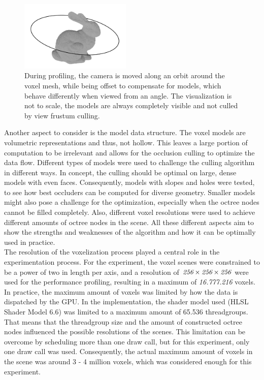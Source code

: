 \begin{figure}[h]
    \centering
    \includegraphics[width=200px]{images/graphics/test-anim-camera-path.jpg}
    \caption{During profiling, the camera is moved along an orbit around the voxel mesh, while being offset to compensate 
    for models, which behave differently when viewed from an angle. The visualization is not to scale, the models 
    are always completely visible and not culled by view frustum culling.}
    \label{fig:test-anim-camera-path}
\end{figure}

Another aspect to consider is the model data structure. The voxel models are volumetric representations and thus, 
not hollow. This leaves a large portion of computation to be irrelevant and allows for the occlusion culling to 
optimize the data flow. Different types of models were used to challenge the culling algorithm in different ways. 
In concept, the culling should be optimal on large, dense models with even faces. Consequently, models with 
slopes and holes were tested, to see how best occluders can be computed for diverse geometry. Smaller models might 
also pose a challenge for the optimization, especially when the octree nodes cannot be filled completely. Also, 
different voxel resolutions were used to achieve different amounts of octree nodes in the scene. All these different 
aspects aim to show the strengths and weaknesses of the algorithm and how it can be optimally used in practice. \\

\noindent
The resolution of the voxelization process played a central role in the experimentation process.
For the experiment, the voxel scenes were constrained to be a power of two in length per axis, and a resolution 
of $\emph{256} \times \emph{256} \times \emph{256}$ were used for the performance profiling, resulting in a maximum 
of \emph{16.777.216} voxels. In practice, the maximum amount of voxels was limited by how the data is dispatched 
by the \ac{GPU}. In the implementation, the shader model used (HLSL Shader Model 6.6) was limited to a maximum 
amount of 65.536 threadgroups. That means that the threadgroup size and the amount of constructed octree nodes 
influenced the possible resolutions of the scenes. This limitation can be overcome by scheduling more than one draw 
call, but for this experiment, only one draw call was used. Consequently, the actual maximum amount of voxels in the 
scene was around 3 - 4 million voxels, which was considered enough for this experiment. \\

